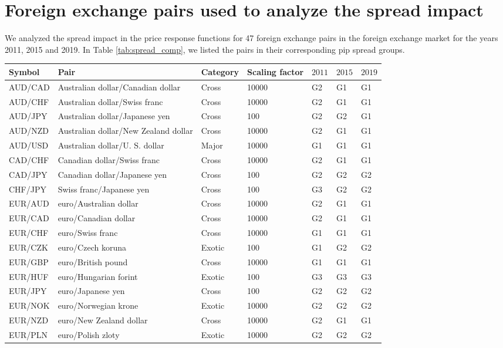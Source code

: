 \section{Foreign exchange pairs used to analyze the spread impact}
\label{app:fx_pairs_spread}

We analyzed the spread impact in the price response functions for 47 foreign
exchange pairs in the foreign exchange market for the years 2011, 2015 and
2019. In Table \ref{tab:spread_comp}, we listed the pairs in their corresponding pip spread groups.

\begin{table*}
\begin{center}
\begin{centering}
    \begin{threeparttable}
    \caption{Foreign exchange pairs used in Sect. \ref{sec:spread_impact}.}
    \label{tab:spread_comp}
    \begin{tabular}{lllllll}
    \hline
    Symbol & Pair & Category & Scaling factor & $2011$ & $2015$ & $2019$\tabularnewline
    \hline
    AUD/CAD & Australian dollar/Canadian dollar & Cross & 10000 & G2 & G1 & G1\tabularnewline
    AUD/CHF & Australian dollar/Swiss franc & Cross & 10000 & G2 & G1 & G1\tabularnewline
    AUD/JPY & Australian dollar/Japanese yen & Cross & 100 & G2 & G2 & G1\tabularnewline
    AUD/NZD & Australian dollar/New Zealand dollar & Cross & 10000 & G2 & G1 & G1\tabularnewline
    AUD/USD & Australian dollar/U. S. dollar & Major & 10000 & G1 & G1 & G1\tabularnewline
    CAD/CHF & Canadian dollar/Swiss franc & Cross & 10000 & G2 & G1 & G1\tabularnewline
    CAD/JPY & Canadian dollar/Japanese yen & Cross & 100 & G2 & G2 & G2\tabularnewline
    CHF/JPY & Swiss franc/Japanese yen & Cross & 100 & G3 & G2 & G2\tabularnewline
    EUR/AUD & euro/Australian dollar & Cross & 10000 & G2 & G1 & G1\tabularnewline
    EUR/CAD & euro/Canadian dollar & Cross & 10000 & G2 & G1 & G1\tabularnewline
    EUR/CHF & euro/Swiss franc & Cross & 10000 & G1 & G1 & G1\tabularnewline
    EUR/CZK & euro/Czech koruna & Exotic & 100 & G1 & G2 & G2\tabularnewline
    EUR/GBP & euro/British pound & Cross & 10000 & G1 & G1 & G1\tabularnewline
    EUR/HUF & euro/Hungarian forint & Exotic & 100 & G3 & G3 & G3\tabularnewline
    EUR/JPY & euro/Japanese yen & Cross & 100 & G2 & G2 & G2\tabularnewline
    EUR/NOK & euro/Norwegian krone & Exotic & 10000 & G2 & G2 & G2\tabularnewline
    EUR/NZD & euro/New Zealand dollar & Cross & 10000 & G2 & G1 & G1\tabularnewline
    EUR/PLN & euro/Polish zloty & Exotic & 10000 & G2 & G2 & G2\tabularnewline

\end{tabular}
\end{threeparttable}
\end{centering}
\end{center}
\end{table*}
